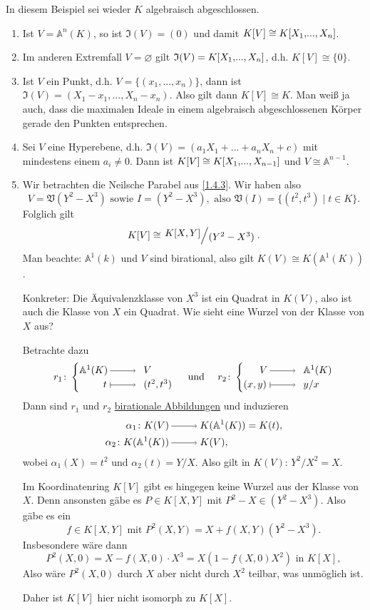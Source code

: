\documentclass[a4paper,12pt,index=toc]{scrbook}
\theoremstyle{keinenummern} %
\def\A{\mathbb{A}}
\def\V{\mathfrak{V}}
\def\I{\mathfrak{I}}
\newcommand{\leer}{\ensuremath{\varnothing}}
\renewcommand{\dotsc}{\ensuremath{\!...}}
\newcommand{\polyx}[1][n]{\ensuremath%
  [X_{1},\dotsc,X_{#1}]}
\begin{document}
\begin{bsp}\label{1.4.8} In diesem Beispiel sei wieder $K$ algebraisch abgeschlossen.
\begin{enumerate}
\item{} Ist $V=\A^n(K)$, so ist $\I(V)=(0)$ und damit $K[V]\cong K\polyx$.
\item{} Im anderen Extremfall $V=\leer$ gilt $\I(V)=K\polyx$, d.h. $K[V]\cong \{0\}$.
\item{} Ist $V$ ein Punkt, d.h. $V=\{(x_1,\dotsc,x_n)\}$, dann ist $\I(V)=(X_1-x_1,\dotsc,X_n-x_n)$. Also gilt dann $K[V]\cong K$. Man weiß ja auch, dass die maximalen Ideale in einem algebraisch abgeschlossenen Körper gerade den Punkten entsprechen.
\item{} Sei $V$ eine Hyperebene, d.h. $\I(V)=(a_1X_1+\dotsc+a_nX_n+c)$ mit mindestens einem $a_i\neq 0$.
Dann ist $K[V]\cong K\polyx[n-1]$ und $V\cong \A^{n-1}$.
\item{} Wir betrachten die Neilsche Parabel aus \cref{1.4.3}. Wir haben also 
\[V=\V(Y^2-X^3)\text{ sowie }I=(Y^2-X^3),\text{ also }\V(I)=\{(t^2,t^3) \mid t\in K\}.\] 
Folglich gilt
\[K[V]\cong \Quotient{K[X,Y]}{(Y^2-X^3)}.\] 
Man beachte: $\A^1(k)$ und $V$ sind birational, also gilt $K(V)\cong K(\A^1(K))$. 

Konkreter:
Die Äquivalenzklasse von $X^3$ ist ein Quadrat in $K(V)$, also ist auch die Klasse von $X$ ein Quadrat.
Wie sieht eine Wurzel von der Klasse von $X$ aus? 

Betrachte  dazu
\[r_1\colon  \begin{cases} \A^1(K)\ra&\!\!\! V \\ \hfill t\mapsto &\!\!\!(t^2,t^3) \end{cases}\quad \text{ und } \quad r_2\colon  \begin{cases} \hfill V\ra&\!\!\! \A^1(K) \\ (x,y) \mapsto &\!\!\! y/x\end{cases}\]
Dann sind $r_1$ und $r_2$ \hyperref[1.6.5]{birationale Abbildungen} und induzieren 
\begin{align*}\alpha_1\colon  K(V)&\ra K(\A^1(K))=K(t),\\
\alpha_2\colon  K(\A^1(K))&\ra K(V),\end{align*}
wobei $\alpha_1(X)=t^2$ und $\alpha_2(t)=Y/X$. Also gilt in $K(V)$: $Y^2/X^2=X$.

Im Koordinatenring $K[V]$ gibt es hingegen keine Wurzel aus der Klasse von $X$. Denn ansonsten gäbe es $P \in K[X,Y]$ mit $P^2-X \in (Y^2-X^3)$. Also gäbe es ein 
\[f \in K[X,Y]\text{ mit }P^2(X,Y)=X+f(X,Y)(Y^2-X^3).\]
Insbesondere wäre dann
 \[P^2(X,0)=X-f(X,0)\cdot X^3=X(1-f(X,0)X^2)\text{ in } K[X],\]
 Also wäre $P^2(X,0)$ durch $X$ aber nicht durch $X^2$ teilbar, was unmöglich ist.
 
Daher ist $K[V]$ hier nicht isomorph zu $K[X]$.
\end{enumerate}
\end{bsp}
\end{document}
